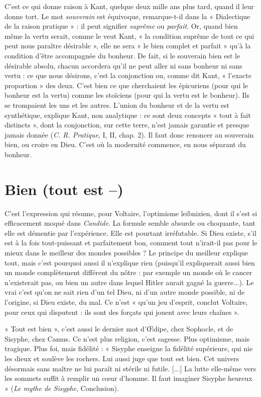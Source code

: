 C’est ce qui donne raison à Kant, quelque deux mille ans plus tard, quand
il leur donne tort. Le mot {\it souverain} est équivoque, remarque-t-il dans la
« Dialectique de la raison pratique » : il peut signifier {\it suprême} ou {\it parfait}. Or,
quand bien même la vertu serait, comme le veut Kant, « la condition suprême
de tout ce qui peut nous paraître désirable », elle ne sera « le bien complet et
parfait » qu’à la condition d’être accompagnée du bonheur. De fait, si le souverain
bien est le désirable absolu, chacun accordera qu’il ne peut aller ni sans
bonheur ni sans vertu : ce que nous désirons, c’est la conjonction ou, comme
dit Kant, « l’exacte proportion » des deux. C’est bien ce que cherchaient les épicuriens
(pour qui le bonheur est la vertu) comme les stoïciens (pour qui la vertu
est le bonheur). Ils se trompaient les uns et les autres. L’union du bonheur et
de la vertu est synthétique, explique Kant, non analytique : ce sont deux concepts
« tout à fait distincts », dont la conjonction, sur cette terre, n’est jamais
garantie et presque jamais donnée ({\it C. R. Pratique}, I, II, chap. 2). Il faut donc
renoncer au souverain bien, ou croire en Dieu. C’est où la modernité commence,
en nous séparant du bonheur.

\section{Bien (tout est {\bf --})}
C'est l’expression qui résume, pour Voltaire, l’optimisme
leibnizien, dont il s’est si efficacement moqué
dans {\it Candide}. La formule semble absurde ou choquante, tant elle est démentie
par l'expérience. Elle est pourtant irréfutable. Si Dieu existe, s’il est à la fois
tout-puissant et parfaitement bon, comment tout n'irait-il pas pour le mieux
dans le meilleur des mondes possibles ? Le principe du meilleur explique tout,
mais c’est pourquoi aussi il n’explique rien (puisqu'il expliquerait aussi bien un
monde complètement différent du nôtre : par exemple un monde où le cancer
n’existerait pas, ou bien un autre dans lequel Hitler aurait gagné la guerre...).
Le vrai c’est qu’on ne sait rien d’un tel Dieu, ni d’un autre monde possible, ni
de l’origine, si Dieu existe, du mal. Ce n’est « qu’un jeu d’esprit, conclut Voltaire,
pour ceux qui disputent : ils sont des forçats qui jouent avec leurs
chaînes ».

« Tout est bien », c’est aussi le dernier mot d'Œdipe, chez Sophocle, et de
Sisyphe, chez Camus. Ce n’est plus religion, c’est sagesse. Plus optimisme, mais
tragique. Plus foi, mais fidélité : « Sisyphe enseigne la fidélité supérieure, qui
nie les dieux et soulève les rochers. Lui aussi juge que tout est bien. Cet univers
désormais sans maître ne lui paraît ni stérile ni futile. [...] La lutte elle-même
vers les sommets suffit à remplir un cœur d’homme. Il faut imaginer Sisyphe
heureux » ({\it Le mythe de Sisyphe}, Conclusion).

